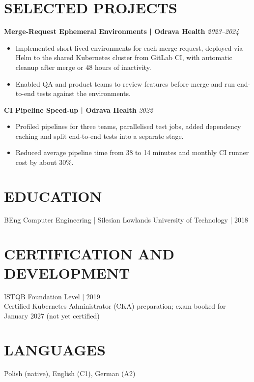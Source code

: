 \documentclass[11pt,a4paper]{article}
\begin{document}
\section*{SELECTED PROJECTS}
\textbf{Merge-Request Ephemeral Environments | Odrava Health} \hfill \textit{2023–2024}
\begin{itemize}
\item Implemented short-lived environments for each merge request, deployed via Helm to the shared Kubernetes cluster from GitLab CI, with automatic cleanup after merge or 48 hours of inactivity.
\item Enabled QA and product teams to review features before merge and run end-to-end tests against the environments.
\end{itemize}

\textbf{CI Pipeline Speed-up | Odrava Health} \hfill \textit{2022}
\begin{itemize}
\item Profiled pipelines for three teams, parallelised test jobs, added dependency caching and split end-to-end tests into a separate stage.
\item Reduced average pipeline time from 38 to 14 minutes and monthly CI runner cost by about 30\%.
\end{itemize}

\section*{EDUCATION}
BEng Computer Engineering | Silesian Lowlands University of Technology | 2018

\section*{CERTIFICATION AND DEVELOPMENT}
ISTQB Foundation Level | 2019\\
Certified Kubernetes Administrator (CKA) preparation; exam booked for January 2027 (not yet certified)

\section*{LANGUAGES}
Polish (native), English (C1), German (A2)
\end{document}
